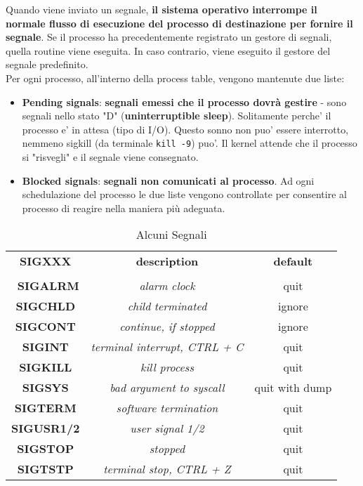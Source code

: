 Quando viene inviato un segnale, \textbf{il sistema operativo interrompe il normale flusso di esecuzione del processo di destinazione per fornire il segnale}. Se il processo ha precedentemente registrato un gestore di segnali, quella routine viene eseguita. In caso contrario, viene eseguito il gestore del segnale predefinito.\\
Per ogni processo, all'interno della process table, vengono mantenute due liste:
\begin{itemize}
    \item \textbf{Pending signals}: \textbf{segnali emessi che il processo dovrà gestire} - sono segnali nello stato "D" (\textbf{uninterruptible sleep}). Solitamente perche' il processo e' in attesa (tipo di I/O). Questo sonno non puo' essere interrotto, nemmeno sigkill (da terminale \texttt{kill -9}) puo'. Il kernel attende che il processo si "risvegli" e il segnale viene consegnato.
    \item \textbf{Blocked signals}: \textbf{segnali non comunicati al processo}. Ad ogni schedulazione del processo le due liste vengono controllate per consentire al processo di reagire nella maniera più adeguata.
\end{itemize}
\begin{table}[ht]
    \centering
    \begin{tabular}{c|c|c}\textbf{}
     \textbf{SIGXXX} &\textbf{description} & \textbf{default} \\ \\\ 
     \textbf{SIGALRM} & \textit{alarm} \textit{clock} & quit \\
     \textbf{SIGCHLD} & \textit{child} \textit{terminated} &ignore \\
     \textbf{SIGCONT} & \textit{continue, if stopped} & ignore \\
     \textbf{SIGINT} & \textit{terminal interrupt, CTRL + C} & quit \\
     \textbf{SIGKILL} & \textit{kill process}& quit \\
     \textbf{SIGSYS} & \textit{bad argument to syscall} & quit with dump \\
     \textbf{SIGTERM} & \textit{software termination} & quit \\ 
     \textbf{SIGUSR1/2 }& \textit{user signal 1/2} & quit \\
     \textbf{SIGSTOP} & \textit{stopped} & quit \\
     \textbf{SIGTSTP} & \textit{terminal stop, CTRL + Z} & quit
\end{tabular}
    \caption{Alcuni Segnali}
    \label{tab:my_label}
\end{table}

